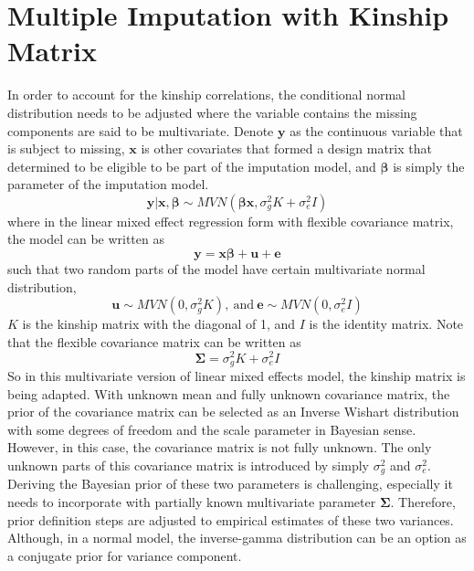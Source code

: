 \section{Multiple Imputation with Kinship Matrix}
In order to account for the kinship correlations, the conditional normal distribution needs to be adjusted where the variable contains the missing components are said to be multivariate. 
Denote $\mathbf{y}$ as the continuous variable that is subject to missing, $\mathbf{x}$ is other covariates that formed a design matrix that determined to be eligible to be part of the imputation model, and $\boldsymbol{\beta}$ is simply the parameter of the imputation model.
\begin{equation} 
    \mathbf{y}|\mathbf{x},\boldsymbol{\beta}\sim MVN(\boldsymbol{\beta}\mathbf{x}, \sigma_g^2K+\sigma_e^2I)
\end{equation}
where in the linear mixed effect regression form with flexible covariance matrix, the model can be written as 
\begin{equation} 
    \mathbf{y}=\mathbf{x}\boldsymbol{\beta}+\mathbf{u}+\mathbf{e}
\end{equation}
such that two random parts of the model have certain multivariate normal distribution,
\begin{equation*}
    \mathbf{u}\sim MVN(0,\sigma_g^2K),~ \text{and}~ \mathbf{e}\sim MVN(0,\sigma_e^2I)
\end{equation*}
$K$ is the kinship matrix with the diagonal of 1, and $I$ is the identity matrix. 
Note that the flexible covariance matrix can be written as 
\begin{equation}
    \boldsymbol{\Sigma}=\sigma_g^2K+\sigma_e^2I
\end{equation}
So in this multivariate version of linear mixed effects model, the kinship matrix is being adapted. 
With unknown mean and fully unknown covariance matrix, the prior of the covariance matrix can be selected as an Inverse Wishart distribution with some degrees of freedom and the scale parameter in Bayesian sense. 
However, in this case, the covariance matrix is not fully unknown. 
The only unknown parts of this covariance matrix is introduced by simply $\sigma_g^2$ and $\sigma_e^2$. 
Deriving the Bayesian prior of these two parameters is challenging, especially it needs to incorporate with partially known multivariate parameter $\boldsymbol{\Sigma}$. 
Therefore, prior definition steps are adjusted to empirical estimates of these two variances. 
Although, in a normal model, the inverse-gamma distribution can be an option as a conjugate prior for variance component. 

